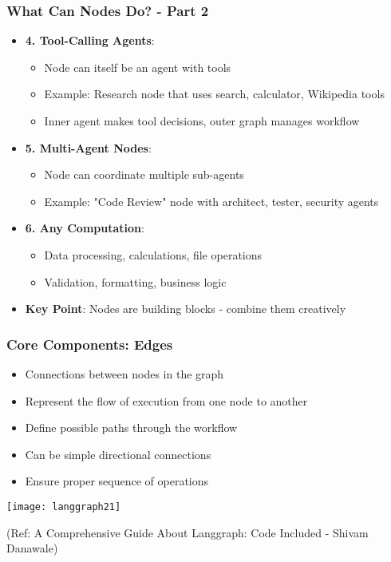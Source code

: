 \begin{frame}[fragile]\frametitle{What Can Nodes Do? - Part 2}
      \begin{itemize}
        \item \textbf{4. Tool-Calling Agents}:
        \begin{itemize}
            \item Node can itself be an agent with tools
            \item Example: Research node that uses search, calculator, Wikipedia tools
            \item Inner agent makes tool decisions, outer graph manages workflow
        \end{itemize}
        \item \textbf{5. Multi-Agent Nodes}:
        \begin{itemize}
            \item Node can coordinate multiple sub-agents
            \item Example: "Code Review" node with architect, tester, security agents
        \end{itemize}
        \item \textbf{6. Any Computation}:
        \begin{itemize}
            \item Data processing, calculations, file operations
            \item Validation, formatting, business logic
        \end{itemize}
        \item \textbf{Key Point}: Nodes are building blocks - combine them creatively
      \end{itemize}
\end{frame}


\begin{frame}[fragile]\frametitle{Core Components: Edges}


      \begin{itemize}
        \item Connections between nodes in the graph
        \item Represent the flow of execution from one node to another
        \item Define possible paths through the workflow
        \item Can be simple directional connections
        \item Ensure proper sequence of operations
      \end{itemize}


\begin{center}
\texttt{[image: langgraph21]}

{\tiny (Ref: A Comprehensive Guide About Langgraph: Code Included - Shivam Danawale)}
\end{center}
 
  

\end{frame}

